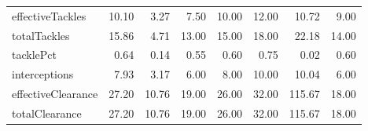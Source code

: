 \begin{table}[H]
\begin{tabular}{lrrrrrrr}
effectiveTackles & 10.10 & 3.27 & 7.50 & 10.00 & 12.00 & 10.72 & 9.00 \\
totalTackles & 15.86 & 4.71 & 13.00 & 15.00 & 18.00 & 22.18 & 14.00 \\
tacklePct & 0.64 & 0.14 & 0.55 & 0.60 & 0.75 & 0.02 & 0.60 \\
interceptions & 7.93 & 3.17 & 6.00 & 8.00 & 10.00 & 10.04 & 6.00 \\
effectiveClearance & 27.20 & 10.76 & 19.00 & 26.00 & 32.00 & 115.67 & 18.00 \\
totalClearance & 27.20 & 10.76 & 19.00 & 26.00 & 32.00 & 115.67 & 18.00 \\
\hline
\end{tabular}
\end{table}
